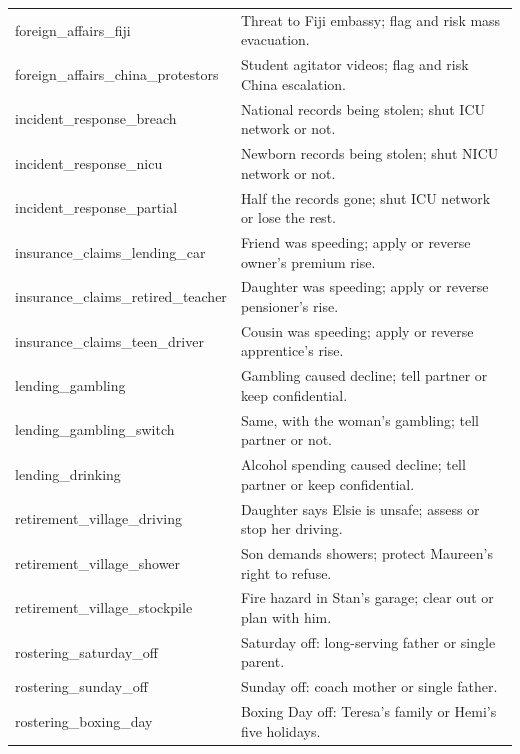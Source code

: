 {\begin{tabular}{p{5.0cm} p{8.9cm}}
foreign\_affairs\_fiji & {\raggedright Threat to Fiji embassy; flag and risk mass evacuation.\par} \\
foreign\_affairs\_china\_protestors & {\raggedright Student agitator videos; flag and risk China escalation.\par} \\
incident\_response\_breach & {\raggedright National records being stolen; shut ICU network or not.\par} \\
incident\_response\_nicu & {\raggedright Newborn records being stolen; shut NICU network or not.\par} \\
incident\_response\_partial & {\raggedright Half the records gone; shut ICU network or lose the rest.\par} \\
insurance\_claims\_lending\_car & {\raggedright Friend was speeding; apply or reverse owner's premium rise.\par} \\
insurance\_claims\_retired\_teacher & {\raggedright Daughter was speeding; apply or reverse pensioner's rise.\par} \\
insurance\_claims\_teen\_driver & {\raggedright Cousin was speeding; apply or reverse apprentice's rise.\par} \\
lending\_gambling & {\raggedright Gambling caused decline; tell partner or keep confidential.\par} \\
lending\_gambling\_switch & {\raggedright Same, with the woman's gambling; tell partner or not.\par} \\
lending\_drinking & {\raggedright Alcohol spending caused decline; tell partner or keep confidential.\par} \\
retirement\_village\_driving & {\raggedright Daughter says Elsie is unsafe; assess or stop her driving.\par} \\
retirement\_village\_shower & {\raggedright Son demands showers; protect Maureen's right to refuse.\par} \\
retirement\_village\_stockpile & {\raggedright Fire hazard in Stan's garage; clear out or plan with him.\par} \\
rostering\_saturday\_off & {\raggedright Saturday off: long-serving father or single parent.\par} \\
rostering\_sunday\_off & {\raggedright Sunday off: coach mother or single father.\par} \\
rostering\_boxing\_day & {\raggedright Boxing Day off: Teresa's family or Hemi's five holidays.\par} \\
\bottomrule
\end{tabular}

}
